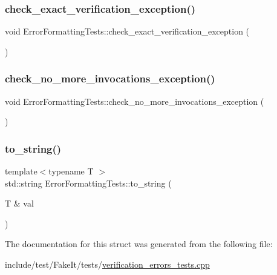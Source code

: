 \mbox{\label{structErrorFormattingTests_a3bd1f1aa2d86e5d30c05bd553b20297a}} 
\subsubsection{\texorpdfstring{check\_exact\_verification\_exception()}{check\_exact\_verification\_exception()}}
{\footnotesize\ttfamily void Error\+Formatting\+Tests\+::check\+\_\+exact\+\_\+verification\+\_\+exception (\begin{DoxyParamCaption}{ }\end{DoxyParamCaption})\hspace{0.3cm}{\ttfamily [inline]}}

\mbox{\label{structErrorFormattingTests_ac093ee18a1e59d70196d68fa06f41347}} 
\subsubsection{\texorpdfstring{check\_no\_more\_invocations\_exception()}{check\_no\_more\_invocations\_exception()}}
{\footnotesize\ttfamily void Error\+Formatting\+Tests\+::check\+\_\+no\+\_\+more\+\_\+invocations\+\_\+exception (\begin{DoxyParamCaption}{ }\end{DoxyParamCaption})\hspace{0.3cm}{\ttfamily [inline]}}

\mbox{\label{structErrorFormattingTests_adebe2df75d978e3378175b9a083d2808}} 
\subsubsection{\texorpdfstring{to\_string()}{to\_string()}}
{\footnotesize\ttfamily template$<$typename T $>$ \\
std\+::string Error\+Formatting\+Tests\+::to\+\_\+string (\begin{DoxyParamCaption}\item[{T \&}]{val }\end{DoxyParamCaption})\hspace{0.3cm}{\ttfamily [inline]}}



The documentation for this struct was generated from the following file\+:\begin{DoxyCompactItemize}
\item 
include/test/\+Fake\+It/tests/\mbox{\hyperlink{verification__errors__tests_8cpp}{verification\+\_\+errors\+\_\+tests.\+cpp}}\end{DoxyCompactItemize}

